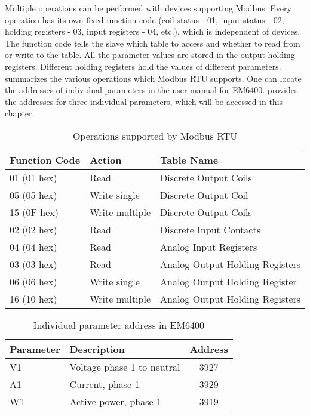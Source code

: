 Multiple operations can be performed with devices supporting Modbus.
Every operation has its own fixed function code (coil status - 01,
input status - 02, holding registers - 03, input registers - 04, etc.),
which is independent of devices. The function code tells the slave which
table to access and whether to read from or write to the table.
All the parameter values are stored in the output holding registers.
Different holding registers hold the values of different parameters.
 summarizes the various operations which
Modbus RTU supports. One can locate the addresses of individual parameters
in the user manual for EM6400.  provides the addresses
for three individual parameters, which will be accessed in this chapter.


\begin{table}
  \centering
  \caption{Operations supported by Modbus RTU}
  \label{tab:modbus-fun-codes}
  \begin{tabular}{llp{3cm}}\hline
    Function Code & Action         & Table Name                      \\  \hline
    01 (01 hex)   & Read           & Discrete Output Coils           \\
    05 (05 hex)   & Write single   & Discrete Output Coil            \\
    15 (0F hex)   & Write multiple & Discrete Output Coils           \\
    02 (02 hex)   & Read           & Discrete Input Contacts         \\
    04 (04 hex)   & Read           & Analog Input Registers          \\
    03 (03 hex)   & Read           & Analog Output Holding Registers \\
    06 (06 hex)   & Write single   & Analog Output Holding Register  \\
    16 (10 hex)   & Write multiple & Analog Output Holding Registers \\
    \hline
  \end{tabular}
\end{table}


\begin{table}
  \centering
  \caption{Individual parameter address in EM6400}
  \label{tab:params-addr}
  \begin{tabular}{llc}\hline
    Parameter & Description                & Address \\  \hline
    V1        & Voltage phase 1 to neutral & 3927    \\
    A1        & Current, phase 1           & 3929    \\
    W1        & Active power, phase 1      & 3919    \\
    \hline
  \end{tabular}
\end{table}


